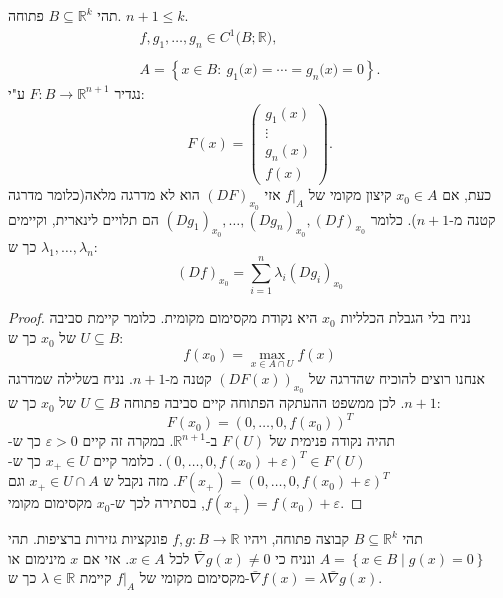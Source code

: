 \documentclass{tstextbook}
\begin{document}
\begin{theorem}
תהי \(B\subseteq \mathbb{R}^k\) פתוחה. \(n+1\leq k\). 
$$\begin{array}{c}{{f,g_{1},\ldots,g_{n}\in C^{1}{\bigl(}B;\mathbb{R}{\bigr)},}}\\ {{{}}}\\ {{A=\left\{x\in B:\ g_{1}{\bigl(}x{\bigr)}=\cdots=g_{n}{\bigl(}x{\bigr)}=0\right\}.}}\end{array}$$
נגדיר \(F:B\to\mathbb{R}^{n+1}\) ע"י:
$$F(x)=\left(\begin{array}{c}{{g_{1}\left(x\right)}}\\ {{\vdots}}\\ {{g_{n}\left(x\right)}}\\ {{f(x)}}\end{array}\right).$$
כעת, אם \(x_{0}\in A\) קיצון מקומי של \(f|_{A}\) אזי \((DF)_{x_{0}}\) הוא לא מדרגה מלאה(כלומר מדרגה קטנה מ-\(n+1\)). כלומר \((Dg_{1})_{x_{0}},\dots,(Dg_{n})_{x_{0}},(Df)_{x_{0}}\) הם תלויים לינארית, וקיימים \(\lambda_{1},\dots,\lambda_{n}\) כך ש:
$$\left(D f\right)_{x_{0}}=\sum_{i=1}^{n}\lambda_{i}\left(D g_{i}\right)_{x_{0}}$$

\end{theorem}
\begin{proof}
נניח בלי הגבלת הכלליות \(x_{0}\) היא נקודת מקסימום מקומית. כלומר קיימת סביבה \(U\subseteq B\) של \(x_{0}\) כך ש:
$$f(x_{0})=\max _{x \in A \cap U} f(x)$$
אנחנו רוצים להוכיח שהדרגה של \((DF(x))_{x_{0}}\) קטנה מ-\(n+1\). נניח בשלילה שמדרגה \(n+1\). לכן ממשפט ההעתקה הפתוחה קיים סביבה פתוחה \(U\subseteq B\) של \(x_{0}\) כך ש:
$$F(x_{0})=(0,\ldots,0,f(x_{0}))^{T}$$
תהיה נקודה פנימית של \(F(U)\) ב-\(\mathbb{R}^{n+1}\). במקרה זה קיים \(\varepsilon>0\) כך ש-\(\left( 0,\dots,0,f(x_{0})+\varepsilon \right)^T \in F(U)\). כלומר קיים \(x_{+}\in U\) כך ש-\(F(x_{+})=\left( 0,\dots,0,f(x_{0})+\varepsilon \right)^T\). מזה נקבל ש \(x_{+}\in U \cap A\) וגם \(f(x_{+})=f(x_{0})+\varepsilon\), בסתירה לכך ש-\(x_{0}\) מקסימום מקומי. 

\end{proof}
\begin{proposition}
תהי \(B\subseteq \mathbb{R}^k\) קבוצה פתוחה, ויהיו \(f,g:B\to\mathbb{R}\) פונקציות גזירות ברציפות.
תהי \(A=\left\{  x \in B\mid g(x)=0  \right\}\) ונניח כי \(\bar{\nabla}g(x) \neq 0\) לכל \(x \in A\). אזי אם \(x\) מינימום או מקסימום מקומי של \(f|_{A}\) קיימת \(\lambda \in \mathbb{R}\) כך ש-\(\bar{\nabla}f(x)=\lambda \bar{\nabla}g(x)\).

\end{proposition}
\end{document}
